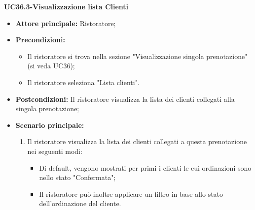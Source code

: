 \pagebreak

\textbf{UC36.3-Visualizzazione lista Clienti}
\begin{itemize}
    \item \textbf{Attore principale:} Ristoratore;
    \item \textbf{Precondizioni:}
    \begin{itemize}
        \item Il ristoratore si trova nella sezione "Visualizzazione singola prenotazione" (si veda UC36);
        \item Il ristoratore seleziona "Lista clienti".
    \end{itemize}
    \item \textbf{Postcondizioni:} Il ristoratore visualizza la lista dei clienti collegati alla singola prenotazione;
    \item \textbf{Scenario principale:}
    \begin{enumerate}
        \item Il ristoratore visualizza la lista dei clienti collegati a questa prenotazione nei seguenti modi:
        \begin{itemize}
            \item Di default, vengono mostrati per primi i clienti le cui ordinazioni sono nello stato "Confermata";
            \item Il ristoratore può inoltre applicare un filtro in base allo stato dell'ordinazione del cliente.
        \end{itemize}
    \end{enumerate}
\end{itemize}

